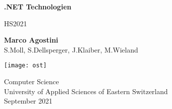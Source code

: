 \begin{titlepage}
    \begin{center}
        \vspace*{1cm}
            
        \Huge
        \textbf{.NET Technologien}
            
        \vspace{0.5cm}
        \LARGE
        HS2021
            
        \vspace{1.5cm}
            
        \textbf{Marco Agostini} \\
        \vspace{1cm}
        \small{S.Moll, S.Dellsperger, J.Klaiber, M.Wieland}
            
        \vfill
            
            
        \vspace{0.8cm}
            
        \texttt{[image: ost]}
            
        \Large
        Computer Science\\
        University of Applied Sciences of Eastern Switzerland\\
        September 2021
        

    \end{center}
\end{titlepage}

\tableofcontents

\pagebreak

